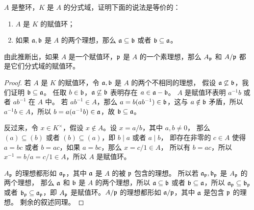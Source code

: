 \begin{problem}
  $A$ 是整环，$K$ 是 $A$ 的分式域，证明下面的说法是等价的：
  \begin{enumerate}
    \item $A$ 是 $K$ 的赋值环；
    \item 如果 $\mathfrak{a},\mathfrak{b}$ 是 $A$ 的两个理想，那么 $\mathfrak{a}\subseteq \mathfrak{b}$
    或者 $\mathfrak{b}\subseteq\mathfrak{a}$。
  \end{enumerate}
  由此推断出，如果 $A$ 是一个赋值环，$\mathfrak{p}$ 是 $A$ 的一个素理想，那么 $A_{\mathfrak{p}}$
  和 $A/\mathfrak{p}$ 都是它们分式域的赋值环。
\end{problem}
\begin{proof}
  若 $A$ 是 $K$ 的赋值环，令 $\mathfrak{a},\mathfrak{b}$ 是 $A$ 的两个不相同的理想，
  假设 $\mathfrak{a}\not\subseteq \mathfrak{b}$，我们证明 $\mathfrak{b}\subseteq\mathfrak{a}$。
  任取 $b\in\mathfrak{b}$，$\mathfrak{a}\not\subseteq\mathfrak{b}$ 表明存在 $a\in\mathfrak{a}-\mathfrak{b}$。
  $A$ 是赋值环表明 $a^{-1}b$ 或者 $ab^{-1}$ 在 $A$ 中。
  若 $ab^{-1}\in A$，那么 $a=b(ab^{-1})\in\mathfrak{b}$，这与
  $a\notin\mathfrak{b}$ 矛盾，所以 $a^{-1}b\in A$，所以
  $b=a(a^{-1}b)\in\mathfrak{a}$，故 $\mathfrak{b}\subseteq \mathfrak{a}$。

  反过来，令 $x\in K^\times$，假设 $x\notin A$。设 $x=a/b$，其中 $a,b\neq 0$，
  那么 $(a)\subseteq (b)$ 或者 $(b)\subseteq (a)$，即 $b\mid a$ 或者 $a\mid b$，
  即存在非零的 $c\in A$ 使得 $a=bc$ 或者 $b=ac$，如果 $a=bc$，那么 $x=c/1\in A$，
  所以有 $b=ac$，所以 $x^{-1}=b/a=c/1\in A$，所以 $A$ 是赋值环。

  $A_{\mathfrak{p}}$ 的理想都形如 $\mathfrak{a}_{\mathfrak{p}}$，其中 $\mathfrak{a}$ 是 $A$ 的被 $\mathfrak{p}$ 包含的理想。
  所以若 $\mathfrak{a}_{\mathfrak{p}},\mathfrak{b}_{\mathfrak{p}}$ 是 $A_{\mathfrak{p}}$ 的两个理想，
  那么 $\mathfrak{a}$ 和 $\mathfrak{b}$ 是 $A$ 的两个理想，所以 $\mathfrak{a}\subseteq \mathfrak{b}$
  或者 $\mathfrak{b}\subseteq \mathfrak{a}$，所以 $\mathfrak{a}_{\mathfrak{p}}\subseteq\mathfrak{b}_{\mathfrak{p}}$
  或者 $\mathfrak{b}_{\mathfrak{p}}\subseteq \mathfrak{a}_{\mathfrak{p}}$，即 $A_{\mathfrak{p}}$
  是赋值环。$A/\mathfrak{p}$ 的理想都形如 $\mathfrak{a}/\mathfrak{p}$，其中 $\mathfrak{a}$ 是包含 $\mathfrak{p}$ 的理想。
  剩余的叙述同理。
\end{proof}

